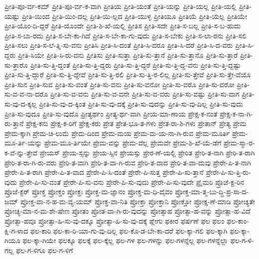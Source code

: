 {ಪ್ರೀತಿ-ಪೂ-ರ್ವ-ಕಮ್
ಪ್ರೀತಿ-ಪೂ-ರ್ವ-ಕ-ವಾಗಿ
ಪ್ರೀತಿಯ
ಪ್ರೀತಿ-ಯಂತೆ
ಪ್ರೀತಿ-ಯನ್ನು
ಪ್ರೀತಿ-ಯಲ್ಲ
ಪ್ರೀತಿ-ಯಲ್ಲಿ
ಪ್ರೀತಿ-ಯಷ್ಟು
ಪ್ರೀತಿ-ಯಿಂದ
ಪ್ರೀತಿ-ಯಿಂ-ದಲ್ಲ
ಪ್ರೀತಿ-ಯಿ-ಲ್ಲದ
ಪ್ರೀತಿ-ಯುಳ್ಳ
ಪ್ರೀತಿಯೂ
ಪ್ರೀತಿಯೆ
ಪ್ರೀತಿ-ಯೆಲ್ಲ
ಪ್ರೀತಿಯೇ
ಪ್ರೀತಿ-ಯೊಂ-ದಿ-ದ್ದರೆ
ಪ್ರೀತಿ-ಯೊಂದೇ
ಪ್ರೀತಿ-ಶಿ-ಖೆ-ಯಲ್ಲಿ
ಪ್ರೀತಿಸ
ಪ್ರೀತಿ-ಸದೇ
ಪ್ರೀತಿ-ಸ-ಬಲ್ಲ
ಪ್ರೀತಿ-ಸ-ಬ-ಹುದು
ಪ್ರೀತಿ-ಸ-ಬಾ-ರದು
ಪ್ರೀತಿ-ಸ-ಬೇ-ಕಾ-ಗಿದೆ
ಪ್ರೀತಿ-ಸ-ಬೇ-ಕಾ-ಗು-ವುದು
ಪ್ರೀತಿ-ಸ-ಬೇಕು
ಪ್ರೀತಿ-ಸ-ಲಾ-ರನು
ಪ್ರೀತಿ-ಸಲಿ
ಪ್ರೀತಿ-ಸಲು
ಪ್ರೀತಿ-ಸ-ಲೆ-ತ್ನಿ-ಸು-ವನು
ಪ್ರೀತಿಸಿ
ಪ್ರೀತಿ-ಸಿ-ದಂತೆ
ಪ್ರೀತಿ-ಸಿ-ದರೂ
ಪ್ರೀತಿ-ಸಿ-ದರೆ
ಪ್ರೀತಿ-ಸಿ-ದ-ವರು
ಪ್ರೀತಿ-ಸಿ-ದ್ದರು
ಪ್ರೀತಿ-ಸಿಯೇ
ಪ್ರೀತಿ-ಸಿ-ರು-ವನು
ಪ್ರೀತಿಸು
ಪ್ರೀತಿ-ಸುತ್ತಾ
ಪ್ರೀತಿ-ಸು-ತ್ತಾನೆ
ಪ್ರೀತಿ-ಸು-ತ್ತಾನೊ
ಪ್ರೀತಿ-ಸು-ತ್ತಾರೆ
ಪ್ರೀತಿ-ಸು-ತ್ತಾರೊ
ಪ್ರೀತಿ-ಸು-ತ್ತಿ-ದ್ದಂತೆ
ಪ್ರೀತಿ-ಸು-ತ್ತಿ-ದ್ದರು
ಪ್ರೀತಿ-ಸು-ತ್ತಿ-ದ್ದರೆ
ಪ್ರೀತಿ-ಸು-ತ್ತಿ-ದ್ದ-ವನು
ಪ್ರೀತಿ-ಸು-ತ್ತಿ-ದ್ದಷ್ಟು
ಪ್ರೀತಿ-ಸು-ತ್ತಿ-ದ್ದಾರೆ
ಪ್ರೀತಿ-ಸು-ತ್ತಿ-ದ್ದೇವೆ
ಪ್ರೀತಿ-ಸು-ತ್ತಿ-ರಲಿ
ಪ್ರೀತಿ-ಸು-ತ್ತಿ-ರ-ಲಿಲ್ಲ
ಪ್ರೀತಿ-ಸು-ತ್ತೇವೆ
ಪ್ರೀತಿ-ಸು-ತ್ತೇ-ವೆಯೊ
ಪ್ರೀತಿ-ಸುನ
ಪ್ರೀತಿ-ಸುವ
ಪ್ರೀತಿ-ಸು-ವಂತೆ
ಪ್ರೀತಿ-ಸು-ವನು
ಪ್ರೀತಿ-ಸು-ವನೋ
ಪ್ರೀತಿ-ಸು-ವರೊ
ಪ್ರೀತಿ-ಸು-ವರೋ
ಪ್ರೀತಿ-ಸು-ವ-ವ-ನಾ-ದರೊ
ಪ್ರೀತಿ-ಸು-ವ-ವನು
ಪ್ರೀತಿ-ಸು-ವ-ವನೇ
ಪ್ರೀತಿ-ಸು-ವ-ವರು
ಪ್ರೀತಿ-ಸು-ವಷ್ಟು
ಪ್ರೀತಿ-ಸು-ವಾಗ
ಪ್ರೀತಿ-ಸು-ವು-ದ-ಕ್ಕಲ್ಲ
ಪ್ರೀತಿ-ಸು-ವು-ದ-ಕ್ಕಿಂತ
ಪ್ರೀತಿ-ಸು-ವು-ದಕ್ಕೆ
ಪ್ರೀತಿ-ಸು-ವುದನ್ನು
ಪ್ರೀತಿ-ಸು-ವು-ದಿಲ್ಲ
ಪ್ರೀತಿ-ಸು-ವುದು
ಪ್ರೀತಿ-ಸು-ವುದೂ
ಪ್ರೀತಿ-ಸು-ವುದೊ
ಪ್ರೀತ್ಯರ್ಥಂ
ಪ್ರೀತ್ಯ-ರ್ಥ-ವಾಗಿ
ಪ್ರೀಯ-ಮಾ-ಣಾಯ
ಪ್ರೇಕ್ಷ-ಕ-ನಂತೆ
ಪ್ರೇಕ್ಷ-ಕ-ನಾ-ಗಿ-ರು-ತ್ತಾನೆ
ಪ್ರೇಕ್ಷ-ಕನು
ಪ್ರೇಕ್ಷ-ಕ-ರಿಗೆ
ಪ್ರೇಕ್ಷ-ಕರು
ಪ್ರೇತ
ಪ್ರೇತ-ಭೂ-ತ-ಗಳು
ಪ್ರೇತ-ರಾ-ಶಿ-ಗಳು
ಪ್ರೇತಾನ್
ಪ್ರೇತ್ಯ
ಪ್ರೇಮ
ಪ್ರೇಮ-ಕ್ಕಾಗಿ
ಪ್ರೇಮ-ಚಿ-ಲುಮೆ
ಪ್ರೇಮ-ದಿಂದ
ಪ್ರೇಮ-ಮಯ
ಪ್ರೇಮ-ಮ-ಯ-ನಾ-ಗಿ-ರುವ
ಪ್ರೇಮ-ಮೂರ್ತಿ
ಪ್ರೇಮ-ಮೂ-ರ್ತಿ-ಯನ್ನು
ಪ್ರೇಮ-ಮೂ-ರ್ತಿಯೇ
ಪ್ರೇಮ-ವನ್ನು
ಪ್ರೇಮ-ವೆಲ್ಲ
ಪ್ರೇಮವೇ
ಪ್ರೇಮ-ಶಿ-ಖೆ-ಯೆ-ಡೆಗೆ
ಪ್ರೇಮ-ಸ್ಮಾ-ರ-ಕ-ವೆ-ನ್ನು-ತ್ತೇವೆ
ಪ್ರೇಯಸ್
ಪ್ರೇಯ-ಸ್ಸನ್ನು
ಪ್ರೇಯ-ಸ್ಸಿನ
ಪ್ರೇಯಸ್ಸು
ಪ್ರೇರ-ಣೆ-ಯಲ್ಲಿ
ಪ್ರೇರಿತ
ಪ್ರೇರಿ-ತ-ನಾಗಿ
ಪ್ರೇರಿ-ತ-ರಾಗಿ
ಪ್ರೇರಿ-ತ-ರಾ-ಗಿ-ರು-ವರು
ಪ್ರೇರಿ-ತ-ವಾಗಿ
ಪ್ರೇರಿ-ತ-ವಾ-ಗಿ-ರುವ
ಪ್ರೇರಿ-ತ-ವಾದ
ಪ್ರೇರಿ-ತ-ವಾ-ದುವು
ಪ್ರೇರೇ-ಪಿ-ತ-ನಾಗಿ
ಪ್ರೇರೇ-ಪಿ-ತ-ರಾಗಿ
ಪ್ರೇರೇ-ಪಿ-ತ-ವಾದ
ಪ್ರೇರೇ-ಪಿ-ಸಿ-ದಂತೆ
ಪ್ರೇರೇ-ಪಿ-ಸುತ್ತ
ಪ್ರೇರೇ-ಪಿ-ಸು-ತ್ತಾನೆ
ಪ್ರೇರೇ-ಪಿ-ಸು-ತ್ತಿ-ರು-ವುದು
ಪ್ರೇರೇ-ಪಿ-ಸು-ವಂತೆ
ಪ್ರೇರೇ-ಪಿ-ಸು-ವನು
ಪ್ರೇರೇ-ಪಿ-ಸು-ವುದು
ಪ್ರೇರೇ-ಪಿ-ಸು-ವುದೇ
ಪ್ರೈಮರಿ
ಪ್ರೊಜೆ-ಕ್ಟ-ರಿನ
ಪ್ರೊಜೆ-ಕ್ಟರ್
ಪ್ರೋಕ್ತ
ಪ್ರೋಕ್ತಂ
ಪ್ರೋಕ್ತಃ
ಪ್ರೋಕ್ತ-ಮ-ಜ್ಞಾನಂ
ಪ್ರೋಕ್ತ-ಮ-ಧಿ-ದೈವಂ
ಪ್ರೋಕ್ತ-ಮಾ-ತ್ಮ-ಬು-ದ್ಧಿ-ಪ್ರ-ಸಾ-ದ-ಜಮ್
ಪ್ರೋಕ್ತ-ವಾ-ನ-ಹ-ಮ-ವ್ಯ-ಯಮ್
ಪ್ರೋಕ್ತ-ವಾ-ನಿತಿ
ಪ್ರೋಕ್ತಾ
ಪ್ರೋಕ್ತಾನಿ
ಪ್ರೋಕ್ತೋ
ಪ್ರೋಕ್ಷ-ಣೆ-ಮಾಡಿ
ಪ್ರೋಚ್ಯತೇ
ಪ್ರೋಚ್ಯ-ಮಾ-ನ-ಮ-ಶೇ-ಷೇಣ
ಪ್ರೋತಂ
ಪ್ರೋತ-ವಾ-ಗಿ-ರು-ವುದನ್ನು
ಪ್ರೋತ್ಸಾಹ
ಪ್ರೋತ್ಸಾ-ಹ-ವನ್ನು
ಪ್ರೋತ್ಸಾ-ಹ-ವಿದೆ
ಪ್ರೋತ್ಸಾ-ಹವೂ
ಪ್ರೋತ್ಸಾ-ಹಿ-ಸು-ವು-ದಕ್ಕೂ
ಪ್ರೋತ್ಸಾ-ಹಿ-ಸು-ವು-ದಕ್ಕೆ
ಪ್ಲೇಗು
ಫಕೀರ
ಫರ್ಷಣೆ
ಫಲ
ಫಲಂ
ಫಲ-ಕಾಂ-ಕ್ಷಿ-ಗ-ಳಾದ
ಫಲ-ಕಾರಿ
ಫಲ-ಕಾ-ರಿ-ಯಾ-ಗು-ವು-ದಿಲ್ಲ
ಫಲ-ಕೊ-ಡ-ಬೇ-ಕಾ-ದರೆ
ಫಲ-ಕ್ಕಾ-ಗಲಿ
ಫಲ-ಕ್ಕಾಗಿ
ಫಲ-ಕ್ಕಾ-ಗಿಯೂ
ಫಲ-ಕ್ಕಾ-ಗಿಯೇ
ಫಲಕ್ಕೂ
ಫಲಕ್ಕೆ
ಫಲ-ಕ್ಕೆಲ್ಲ
ಫಲ-ಗಳ
ಫಲ-ಗಳನ್ನು
ಫಲ-ಗಳನ್ನೆಲ್ಲ
ಫಲ-ಗಳನ್ನೆಲ್ಲಾ
ಫಲ-ಗ-ಳಿ-ಗಲ್ಲ
ಫಲ-ಗ-ಳಿಗೂ
ಫಲ-ಗ-ಳಿಗೆ
}
